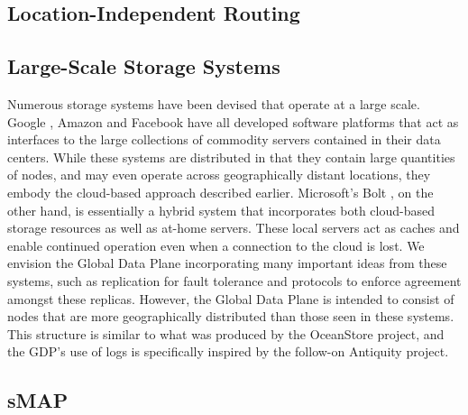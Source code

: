 \subsection{Location-Independent Routing}

\subsection{Large-Scale Storage Systems}
Numerous storage systems have been devised that operate at a large scale. Google \cite{bigtable, megastore}, Amazon \cite{dynamo} and Facebook \cite{haystack} have all developed software platforms that act as interfaces to the large collections of commodity servers contained in their data centers. While these systems are distributed in that they contain large quantities of nodes, and may even operate across geographically distant locations, they embody the cloud-based approach described earlier. Microsoft's Bolt \cite{bolt}, on the other hand, is essentially a hybrid system that incorporates both cloud-based storage resources as well as at-home servers. These local servers act as caches and enable continued operation even when a connection to the cloud is lost. We envision the Global Data Plane incorporating many important ideas from these systems, such as replication for fault tolerance and protocols to enforce agreement amongst these replicas. However, the Global Data Plane is intended to consist of nodes that are more geographically distributed than those seen in these systems. This structure is similar to what was produced by the OceanStore \cite{oceanstore} project, and the GDP's use of logs is specifically inspired by the follow-on Antiquity \cite{antiquity} project.

\subsection{sMAP}